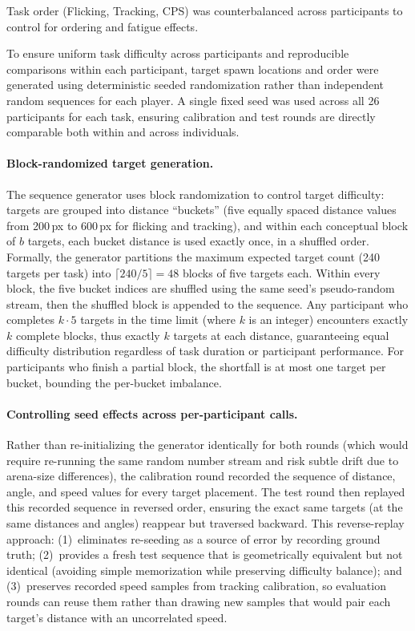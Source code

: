 Task order (Flicking, Tracking, CPS) was counterbalanced across participants
to control for ordering and fatigue effects.

To ensure uniform task difficulty across participants and reproducible comparisons
within each participant, target spawn locations and order were generated using
deterministic seeded randomization rather than independent random sequences for
each player. A single fixed seed was used across all 26 participants for each
task, ensuring calibration and test rounds are directly comparable both within and
across individuals.

\paragraph{Block-randomized target generation.}
The sequence generator uses block randomization to control target difficulty:
targets are grouped into distance ``buckets'' (five equally spaced distance values
from 200\,px to 600\,px for flicking and tracking), and within each conceptual block
of $b$ targets, each bucket distance is used exactly once, in a shuffled order.
Formally, the generator partitions the maximum expected target count (240 targets
per task) into $\lceil 240/5 \rceil = 48$ blocks of five targets each. Within every
block, the five bucket indices are shuffled using the same seed's pseudo-random stream,
then the shuffled block is appended to the sequence. Any participant who completes
$k \cdot 5$ targets in the time limit (where $k$ is an integer) encounters exactly
$k$ complete blocks, thus exactly $k$ targets at each distance, guaranteeing equal
difficulty distribution regardless of task duration or participant performance.
For participants who finish a partial block, the shortfall is at most one target
per bucket, bounding the per-bucket imbalance.

\paragraph{Controlling seed effects across per-participant calls.}
Rather than re-initializing the generator identically for both rounds (which would
require re-running the same random number stream and risk subtle drift due
to arena-size differences), the calibration round recorded the sequence of
distance, angle, and speed values for every target placement. The test round then
replayed this recorded sequence in reversed order, ensuring the exact
same targets (at the same distances and angles) reappear but traversed backward.
This reverse-replay approach: (1)~eliminates re-seeding as a source of error by
recording ground truth; (2)~provides a fresh test sequence that is geometrically
equivalent but not identical (avoiding simple memorization while preserving difficulty
balance); and (3)~preserves recorded speed samples from tracking calibration,
so evaluation rounds can reuse them rather than drawing new samples that would
pair each target's distance with an uncorrelated speed.


